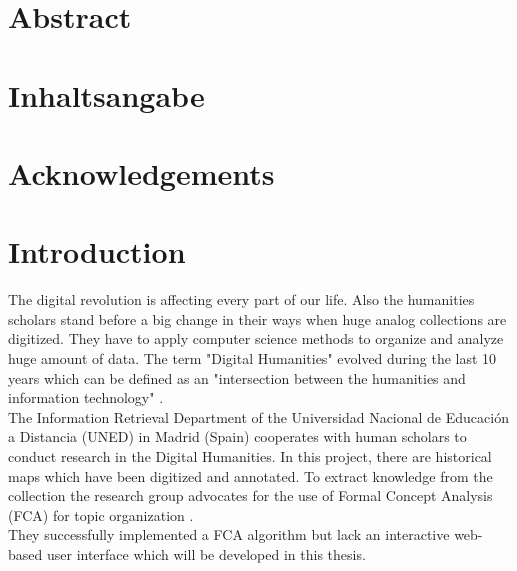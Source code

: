 \documentclass[11pt]{report}
\begin{document}


\newpage
\thispagestyle{empty}
\mbox{}

\chapter*{Abstract}
\blindtext

\newpage
\thispagestyle{empty}
\mbox{}

\chapter*{Inhaltsangabe}
\blindtext

\newpage
\thispagestyle{empty}
\mbox{}

\chapter*{Acknowledgements}
\blindtext

\newpage
\thispagestyle{empty}
\mbox{}

\tableofcontents
\newpage

\newpage
\thispagestyle{empty}
\mbox{}

\chapter{Introduction}

The digital revolution is affecting every part of our life. Also the humanities scholars stand before a big change in their ways when huge analog collections are digitized. They have to apply computer science methods to organize and analyze huge amount of data. The term "Digital Humanities" evolved during the last 10 years which can be defined as an "intersection between the humanities and information technology" \cite{Svensson2010}.\\

 The Information Retrieval Department of the Universidad Nacional de Educación a Distancia (UNED) in Madrid (Spain) cooperates with human scholars to conduct research in the Digital Humanities. In this project, there are historical maps which have been digitized and annotated. To extract knowledge from the collection the research group advocates for the use of Formal Concept Analysis (FCA) for topic organization \cite{Castellanos,Cigarran}.\\
 
 They successfully implemented a FCA algorithm but lack an interactive web-based user interface which will be developed in this thesis. \\
   
\end{document}
